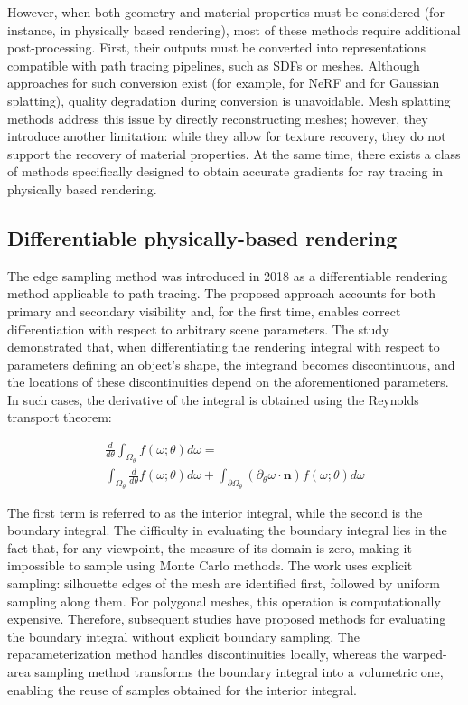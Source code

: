 \documentclass{ieeeaccess}
\begin{document}
However, when both geometry and material properties must be considered (for instance, in physically based rendering), most of these methods require additional post-processing. First, their outputs must be converted into representations compatible with path tracing pipelines, such as SDFs or meshes. Although approaches for such conversion exist (for example, \cite{BakedSDF, NeRFMeshing} for NeRF and \cite{SuGaR} for Gaussian splatting), quality degradation during conversion is unavoidable. Mesh splatting methods address this issue by directly reconstructing meshes; however, they introduce another limitation: while they allow for texture recovery, they do not support the recovery of material properties. At the same time, there exists a class of methods specifically designed to obtain accurate gradients for ray tracing in physically based rendering.

\subsection{Differentiable physically-based rendering}

The edge sampling method \cite{EdgeSampling} was introduced in 2018 as a differentiable rendering method applicable to path tracing. The proposed approach accounts for both primary and secondary visibility and, for the first time, enables correct differentiation with respect to arbitrary scene parameters. The study demonstrated that, when differentiating the rendering integral with respect to parameters defining an object's shape, the integrand becomes discontinuous, and the locations of these discontinuities depend on the aforementioned parameters. In such cases, the derivative of the integral is obtained using the Reynolds transport theorem:

\begin{equation}
    \begin{gathered}
        \frac{d}{d \theta} \int_{\Omega_\theta}{f(\omega;\theta) d\omega} =
        \\
        \int_{\Omega_{\theta}}{\frac{d}{d \theta} f(\omega;\theta) d\omega} + \int_{\partial \Omega_{\theta}}{(\partial_\theta \omega \cdot \textbf{n}) f(\omega;\theta) d\omega}
    \end{gathered}
\end{equation}

The first term is referred to as the interior integral, while the second is the boundary integral. The difficulty in evaluating the boundary integral lies in the fact that, for any viewpoint, the measure of its domain is zero, making it impossible to sample using Monte Carlo methods. The work \cite{EdgeSampling} uses explicit sampling: silhouette edges of the mesh are identified first, followed by uniform sampling along them. For polygonal meshes, this operation is computationally expensive. Therefore, subsequent studies have proposed methods for evaluating the boundary integral without explicit boundary sampling. The reparameterization method \cite{Reparam} handles discontinuities locally, whereas the warped-area sampling method \cite{WAS} transforms the boundary integral into a volumetric one, enabling the reuse of samples obtained for the interior integral.
\end{document}
